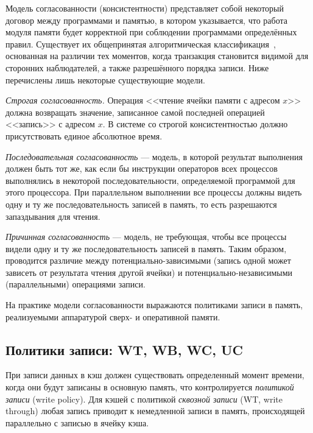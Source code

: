 Модель согласованности (консистентности) представляет собой некоторый договор между программами и памятью, в котором указывается, что работа модуля памяти будет корректной при соблюдении программами определённых правил. Существует их общепринятая алгоритмическая классификация~\cite{Mosberger93memoryconsistency}, основанная на различии тех моментов, когда транзакция становится видимой для сторонних наблюдателей, а также разрешённого порядка записи. Ниже перечислены лишь некоторые существующие модели.

\begin{enumerate*}
\item    \textit{Строгая согласованность.} Операция <<чтение ячейки памяти с адресом $x$>> должна возвращать значение, записанное самой последней операцией <<запись>> с адресом $x$. В системе со строгой консистентностью должно присутствовать единое абсолютное время.

\item    \textit{Последовательная согласованность} --- модель, в которой результат выполнения должен быть тот же, как если бы инструкции операторов всех процессов выполнялись в некоторой последовательности, определяемой программой для этого процессора. При параллельном выполнении все процессы должны видеть одну и ту же последовательность записей в память, то есть разрешаются запаздывания для чтения.

\item    \textit{Причинная согласованность} --- модель, не требующая, чтобы все процессы видели одну и ту же последовательность записей в память. Таким образом, проводится различие между потенциально-зависимыми (запись одной может зависеть от результата чтения другой ячейки) и потенциально-независимыми (параллельными) операциями записи.

\end{enumerate*}

На практике модели согласованности выражаются политиками записи в память, реализуемыми аппаратурой сверх- и оперативной памяти.

\subsection[Политики записи]{Политики записи: WT, WB, WC, UC}

При записи данных в кэш должен существовать определенный момент времени, когда они будут записаны в основную память, что контролируется \textit{политикой записи} (\abbr write policy). Для кэшей с политикой \textit{сквозной записи} (WT, \abbr write through) любая запись приводит к немедленной записи в память, происходящей параллельно с записью в ячейку кэша. 

